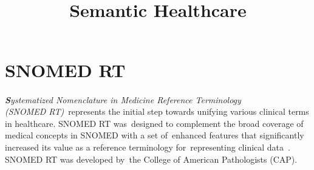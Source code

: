 \documentclass[DIV=calc, paper=a4, fontsize=12pt, onecolumn]{scrartcl}	 %
\title{Semantic Healthcare} %
\author{\authoring} %
\date{} %
\newcommand{\initial}[1]{ %
\lettrine[lines=3,lhang=0.3,nindent=0em,slope=0em]{
\color{DarkBlue}
{\textbf{\textit{#1}}}}{}}
\begin{document}
  \maketitle
  \renewcommand{\contentsname}{\hspace{120pt} Table of Contents}
  \tableofcontents
  \thispagestyle{fancy} %
  \vspace{20pt}
   \section[Systematized Nomenclature in Medicine  Reference Terminology (SNOMED RT\textsuperscript{\textregistered})]
   {SNOMED RT\textsuperscript{\textregistered}}
   \label{sec:snomedrt}
   
   \initial{S}\textit{ystematized Nomenclature in Medicine Reference Terminology\\ (SNOMED RT)}\
   represents the initial step towards unifying various clinical terms in healthcare. SNOMED RT was\
   designed to complement the broad coverage of medical concepts in SNOMED with a set of\
   enhanced features that significantly increased its value as a reference terminology for\
   representing clinical data~\citep{spackman_snomed_1997}. SNOMED RT was developed by\
   the College of American Pathologists (CAP).\\
   
\end{document}
